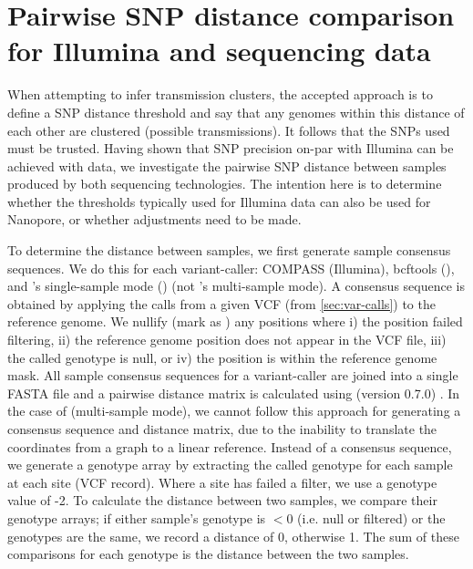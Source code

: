 
\section{Pairwise SNP distance comparison for Illumina and \ont{} sequencing data}

When attempting to infer transmission clusters, the accepted approach is
to define a SNP distance threshold and say that any genomes within this
distance of each other are clustered (possible transmissions). It follows that the SNPs used must
be trusted. Having shown that SNP precision on-par with Illumina can be
achieved with \ont{} data, we investigate the pairwise SNP distance
between samples produced by both sequencing technologies. The intention
here is to determine whether the thresholds typically used for Illumina
data can also be used for Nanopore, or whether adjustments need to be
made.

To determine the distance between samples, we first generate sample consensus sequences. We do this for each variant-caller: COMPASS (Illumina), bcftools (\ont{}), and \pandora{}'s single-sample mode (\ont{}) (not \pandora{}'s multi-sample mode). A consensus sequence is obtained by applying the calls from a given VCF (from \autoref{sec:var-calls}) to the \mtb{} reference genome. We nullify (mark as ) any positions where i) the position failed filtering, ii) the reference genome position does not appear in the VCF file, iii) the called genotype is null, or iv) the position is within the reference genome mask. All sample consensus sequences for a variant-caller are joined into a single FASTA file and a pairwise distance matrix is calculated using  (version 0.7.0) \cite{snp-dists}. In the case of \pandora{}  (multi-sample mode), we cannot follow this approach for generating a consensus sequence and distance matrix, due to the inability to translate the coordinates from a graph to a linear reference. Instead of a consensus sequence, we generate a genotype array by extracting the called genotype for each sample at each site (VCF record). Where a site has failed a filter, we use a genotype value of -2. To calculate the distance between two samples, we compare their genotype arrays; if either sample's genotype is $<0$ (i.e. null or filtered) or the genotypes are the same, we record a distance of 0, otherwise 1. The sum of these comparisons for each genotype is the distance between the two samples.

